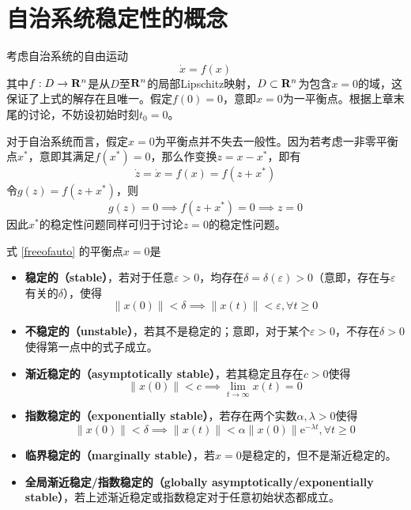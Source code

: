 \section{自治系统稳定性的概念}\label{2Aref}
考虑自治系统的自由运动
\begin{equation}\label{freeofauto}
  \dot{x}=f(x)
\end{equation}
其中$f:D\to\mathbf{R}{}^n$是从$D$至$\mathbf{R}{}^n$的局部Lipschitz映射，$D\subset\mathbf{R}{}^n$为包含$x=0$的域，这保证了上式的解存在且唯一。假定$f(0)=0$，意即$x=0$为一平衡点。根据上章末尾的讨论，不妨设初始时刻$t_0=0$。
\begin{note}
  对于自治系统而言，假定$x=0$为平衡点并不失去一般性。因为若考虑一非零平衡点$x^\ast$，意即其满足$f(x^\ast)=0$，那么作变换$z=x-x^\ast$，即有\[\dot{z}=\dot{x}=f(x)=f(z+x^\ast)\]令$g(z)=f(z+x^\ast)$，则\[g(z)=0\implies f(z+x^\ast)=0\implies z=0\]因此$x^\ast$的稳定性问题同样可归于讨论$z=0$的稳定性问题。
\end{note}
\begin{definition}[自治系统的稳定性]
  式 \eqref{freeofauto} 的平衡点$x=0$是
  \begin{itemize}[leftmargin=1em]
    \item {\bf 稳定的（stable）}，若对于任意$\varepsilon>0$，均存在$\delta=\delta(\varepsilon)>0$（意即，存在与$\varepsilon$有关的$\delta$），使得
    \[\|x(0)\|<\delta\implies \|x(t)\|<\varepsilon,\forall t\ge 0\]
    \item {\bf 不稳定的（unstable）}，若其不是稳定的；意即，对于某个$\varepsilon>0$，不存在$\delta>0$使得第一点中的式子成立。
    \item {\bf 渐近稳定的（asymptotically stable）}，若其稳定且存在$c>0$使得\[\|x(0)\|<c\implies \lim_{t\to\infty}x(t)=0\]
    \item {\bf 指数稳定的（exponentially stable）}，若存在两个实数$\alpha,\lambda>0$使得\[\|x(0)\|<\delta\implies \|x(t)\|<\alpha\|x(0)\|\mathrm{e}^{-\lambda t},\forall t\ge 0\]
    \item {\bf 临界稳定的（marginally stable）}，若$x=0$是稳定的，但不是渐近稳定的。
    \item {\bf 全局渐近稳定/指数稳定的（globally asymptotically/exponentially stable）}，若上述渐近稳定或指数稳定对于任意初始状态都成立。
  \end{itemize}
\end{definition}

